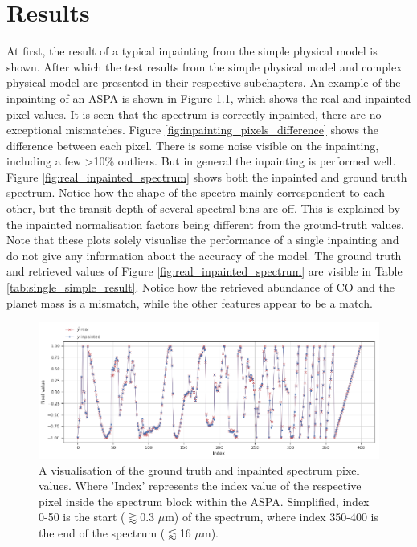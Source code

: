 \chapter{Results}
At first, the result of a typical inpainting from the simple physical model is shown. After which the test results from the simple physical model and complex physical model are presented in their respective subchapters. An example of the inpainting of an ASPA is shown in Figure \ref{fig:inpainting_pixels}, which shows the real and inpainted pixel values. It is seen that the spectrum is correctly inpainted, there are no exceptional mismatches. Figure \ref{fig:inpainting_pixels_difference} shows the difference between each pixel. There is some noise visible on the inpainting, including a few >10\% outliers. But in general the inpainting is performed well.  Figure \ref{fig:real_inpainted_spectrum} shows both the inpainted and ground truth spectrum. Notice how the shape of the spectra mainly correspondent to each other, but the transit depth of several spectral bins are off. This is explained by the inpainted normalisation factors being different from the ground-truth values. Note that these plots solely visualise the performance of a single inpainting and do not give any information about the accuracy of the model. The ground truth and retrieved values of Figure \ref{fig:real_inpainted_spectrum} are visible in Table \ref{tab:single_simple_result}. Notice how the retrieved abundance of CO and the planet mass is a mismatch, while the other features appear to be a match. 

\begin{figure} [!htb]
    \centering
    \includegraphics[scale=0.4]{figuren/real_inpainted_pixels.png}
    \caption{A visualisation of the ground truth and inpainted spectrum pixel values. Where 'Index' represents the index value of the respective pixel inside the spectrum block within the ASPA. Simplified, index 0-50 is the start ($\gtrapprox$0.3 $\mu$m) of the spectrum, where index 350-400 is the end of the spectrum ($\lessapprox$16 $\mu$m).}
    \label{fig:inpainting_pixels}
\end{figure}


